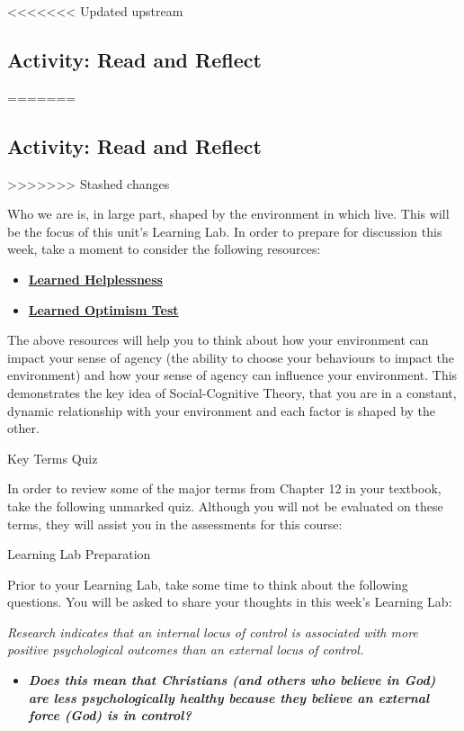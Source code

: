 \documentclass[
]{book}
\providecommand{\tightlist}{%
  \setlength{\itemsep}{0pt}\setlength{\parskip}{0pt}}
\begin{document}
<<<<<<< Updated upstream
\hypertarget{activity-read-and-reflect-4}{%
\subsection*{Activity: Read and Reflect}\label{activity-read-and-reflect-4}}
=======
\hypertarget{activity-read-and-reflect-3}{%
\subsection*{Activity: Read and Reflect}\label{activity-read-and-reflect-3}}
>>>>>>> Stashed changes

\begin{reflect}
Who we are is, in large part, shaped by the environment in which live. This will be the focus of this unit's Learning Lab. In order to prepare for discussion this week, take a moment to consider the following resources:

\begin{itemize}
\tightlist
\item
  \href{http://www.ldonline.org/article/6154/}{\textbf{Learned Helplessness}}\\
\item
  \href{https://web.stanford.edu/class/msande271/onlinetools/LearnedOpt.html}{\textbf{Learned Optimism Test}}
\end{itemize}

The above resources will help you to think about how your environment can impact your sense of agency (the ability to choose your behaviours to impact the environment) and how your sense of agency can influence your environment. This demonstrates the key idea of Social-Cognitive Theory, that you are in a constant, dynamic relationship with your environment and each factor is shaped by the other.

{Key Terms Quiz}

In order to review some of the major terms from Chapter 12 in your textbook, take the following unmarked quiz. Although you will not be evaluated on these terms, they will assist you in the assessments for this course:

{Learning Lab Preparation}

Prior to your Learning Lab, take some time to think about the following questions. You will be asked to share your thoughts in this week's Learning Lab:

\emph{Research indicates that an internal locus of control is associated with more positive psychological outcomes than an external locus of control.}

\begin{itemize}
\tightlist
\item
  \textbf{\emph{Does this mean that Christians (and others who believe in God) are less psychologically healthy because they believe an external force (God) is in control?}}
\end{itemize}
\end{reflect}
\end{document}
